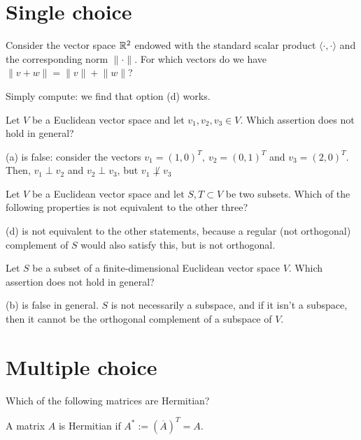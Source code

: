 \documentclass[12pt]{article}
\begin{document}
\section*{Single choice}

\begin{problem}{}{}
    Consider the vector space $\mathbb{R}^2$ endowed with the standard scalar product $\langle \cdot, \cdot \rangle$ and the corresponding norm $\lVert \cdot \rVert$. For which vectors do we have $\lVert v + w \rVert = \lVert v \rVert + \lVert w \rVert$?
\end{problem}

Simply compute: we find that option (d) works.

\begin{problem}{}{}
    Let $V$ be a Euclidean vector space and let $v_1,v_2,v_3 \in V$. Which assertion does not hold in general?
\end{problem}

(a) is false: consider the vectors $v_1 = (1, 0)^T,\ v_2 = (0, 1)^T$ and $v_3 = (2, 0)^T$. Then, $v_1 \perp v_2$ and $v_2 \perp v_3$, but $v_1 \not\perp v_3$

\begin{problem}{}{}
    Let $V$ be a Euclidean vector space and let $S, T \subset V$ be two subsets. Which of the following properties is not equivalent to the other three?
\end{problem}

(d) is not equivalent to the other statements, because a regular (not orthogonal) complement of $S$ would also satisfy this, but is not orthogonal.

\begin{problem}{}{}
    Let $S$ be a subset of a finite-dimensional Euclidean vector space $V$. Which assertion does not hold in general?
\end{problem}

(b) is false in general. $S$ is not necessarily a subspace, and if it isn't a subspace, then it cannot be the orthogonal complement of a subspace of $V$.

\section*{Multiple choice}

\begin{problem}{}{}
    Which of the following matrices are Hermitian?
\end{problem}

A matrix $A$ is Hermitian if $A^* := (\overline{A})^T = A$.
\end{document}
